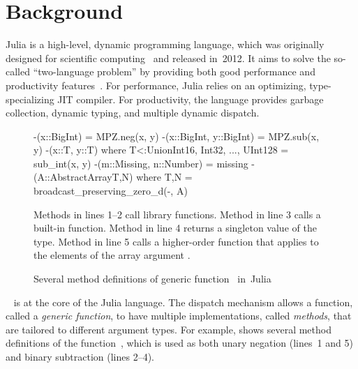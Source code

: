 \chapter{Background} %
\label{chap:background}


Julia is a high-level, dynamic programming language, which was originally
designed for scientific computing~\cite{bib:bezanson:julia-fresh:2017}
and released in~2012.
It aims to solve the so-called ``two-language problem''
by providing both good performance and productivity
features~\cite{bib:bezanson:julia-dyn-perf:oopsla:2018}.
For performance, Julia relies on an optimizing, type-specializing JIT compiler.
For productivity, the language provides garbage collection, dynamic typing, and
multiple dynamic dispatch.

\begin{figure}[t]
\begin{julia}
-(x::BigInt) = MPZ.neg(x, y)
-(x::BigInt, y::BigInt) = MPZ.sub(x, y)
-(x::T, y::T) where T<:Union{Int16, Int32, ..., UInt128} = sub_int(x, y)
-(m::Missing, n::Number) = missing
-(A::AbstractArray{T,N}) where {T,N} = broadcast_preserving_zero_d(-, A)
\end{julia}
\caption{Several method definitions of generic function~\cjl{(-)} in~Julia
}\label{fig:code:subtraction}
\begin{tablenotes}[para]
\small
Methods in lines 1--2 call library functions.
Method in line 3 calls a built-in function.
Method in line 4 returns a singleton value  of the  type.
Method in line 5 calls a higher-order function that applies \cjl{(-)} to the
elements of the array argument .
\end{tablenotes}
\end{figure}

~\cite{bib:bobrow:common-loops:1986,%
bib:chambers:multi-cecil:1992} is at the core of the Julia language.
The dispatch mechanism allows a function, called a \emph{generic
function}, to have multiple implementations, called \emph{methods}, that are
tailored to different argument types. For example, 
shows several method definitions of the function~\cjl{(-)},
which is used as both unary negation (lines~1 and 5)
and binary subtraction (lines 2--4).

